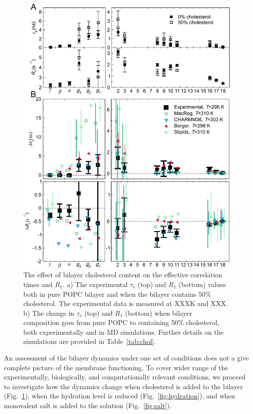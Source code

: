 \documentclass[journal=jpcbfk,manuscript=article,layout=twocolumn]{achemso}
\begin{document}
\begin{figure}[ht!]

\centering
\includegraphics[scale=0.49]{cholesterol.pdf}  
\caption{The effect of bilayer cholesterol content on the effective correlation times and $R_{1}$. a) The experimental $\tau_\mathrm{e}$ (top) and $R_{1}$ (bottom) values both in pure POPC bilayer and when the bilayer contains 50\% cholesterol. The experimental data is measured at XXXK and XXX. b) The change in $\tau_\mathrm{e}$ (top) and $R_{1}$ (bottom) when bilayer composition goes from pure POPC to containing 50\% cholesterol, both experimentally and in MD simulations. Further details on the simulations are provided in Table~\ref{tab:chol}.}
\label{fig:chol}


\end{figure}

An assessment of the bilayer dynamics under one set of conditions does not a give complete picture of the membrane functioning. To cover wider range of the experimentally, biologically, and computationally relevant conditions, we proceed to investigate how the dynamics change when cholesterol is added to the bilayer (Fig.~\ref{fig:chol}), when the hydration level is reduced (Fig.~\ref{fig:hydration}), and when monovalent salt is added to the solution (Fig.~\ref{fig:salt}).
\end{document}
